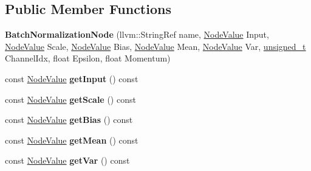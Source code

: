 \subsection*{Public Member Functions}
\begin{DoxyCompactItemize}
\item 
\mbox{\label{classglow_1_1_batch_normalization_node_ac83213be2805b90295dcbebe974e3b61}} 
{\bfseries Batch\+Normalization\+Node} (llvm\+::\+String\+Ref name, \hyperlink{structglow_1_1_node_value}{Node\+Value} Input, \hyperlink{structglow_1_1_node_value}{Node\+Value} Scale, \hyperlink{structglow_1_1_node_value}{Node\+Value} Bias, \hyperlink{structglow_1_1_node_value}{Node\+Value} Mean, \hyperlink{structglow_1_1_node_value}{Node\+Value} Var, \hyperlink{namespaceglow_a0ca574644e1e42ef193a9947fb4d8911}{unsigned\+\_\+t} Channel\+Idx, float Epsilon, float Momentum)
\item 
\mbox{\label{classglow_1_1_batch_normalization_node_af02568a2b9d14f945b824e5e891572d9}} 
const \hyperlink{structglow_1_1_node_value}{Node\+Value} {\bfseries get\+Input} () const
\item 
\mbox{\label{classglow_1_1_batch_normalization_node_a7e5092daaa099df0b171c7a27cdcdc1b}} 
const \hyperlink{structglow_1_1_node_value}{Node\+Value} {\bfseries get\+Scale} () const
\item 
\mbox{\label{classglow_1_1_batch_normalization_node_ae8da0f71964f2f81d7bbaa6205e9488f}} 
const \hyperlink{structglow_1_1_node_value}{Node\+Value} {\bfseries get\+Bias} () const
\item 
\mbox{\label{classglow_1_1_batch_normalization_node_abd0d3ea19fd9ec231b4045b6fe7f75c7}} 
const \hyperlink{structglow_1_1_node_value}{Node\+Value} {\bfseries get\+Mean} () const
\item 
\mbox{\label{classglow_1_1_batch_normalization_node_a09b26c4c6147cc7420abaa96cf1cd776}} 
const \hyperlink{structglow_1_1_node_value}{Node\+Value} {\bfseries get\+Var} () const
\item 
\mbox{\label{classglow_1_1_batch_normalization_node_a5a4ee20a3dbada11582293ad561ce05d}} 

\end{DoxyCompactItemize}
